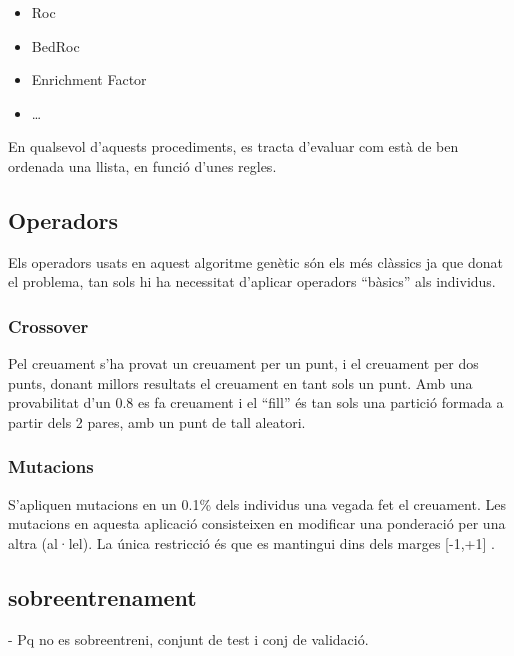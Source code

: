 \documentclass[titlepage,a4paper,12pt]{book}
\begin{document}
\begin{itemize}
	\item Roc
	\item BedRoc
	\item Enrichment Factor
	\item \dots
\end{itemize}


En qualsevol d'aquests procediments, es tracta d'evaluar com està de ben ordenada una llista, en
funció d'unes regles.

\subsection{Operadors} %
\label{sub:Operadors}

Els operadors usats en aquest algoritme genètic són els més clàssics ja que donat el problema, tan
sols hi ha necessitat d'aplicar operadors ``bàsics'' als individus.  

\subsubsection{Crossover} %
\label{ssub:Crossover}
Pel creuament s'ha provat un creuament per un punt, i el creuament per dos punts, donant millors
resultats el creuament en tant sols un punt.  Amb una provabilitat d'un 0.8 es fa creuament i el
``fill'' és tan sols una partició formada a partir dels 2 pares, amb un punt de tall aleatori.

\subsubsection{Mutacions} %
\label{ssub:Mutacions}

S'apliquen mutacions en un 0.1\% dels individus una vegada fet el creuament.  Les mutacions en
aquesta aplicació consisteixen en modificar una ponderació per una altra (al·lel).  La única
restricció és que es mantingui dins dels marges [-1,+1] .

\subsection{sobreentrenament} %
\label{sub:sobreentrenament}

- Pq no es sobreentreni, conjunt de test i conj de validació.

\end{document}
